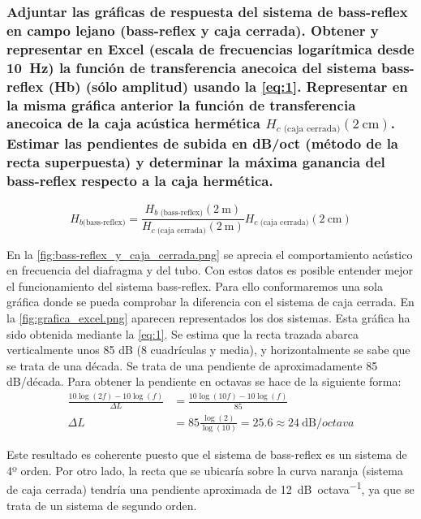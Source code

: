 \documentclass[10pt]{article}
\begin{document}
\subsubsection{Adjuntar las gráficas de respuesta del sistema de bass-reflex en campo lejano (bass-reflex y caja cerrada). Obtener y representar en Excel (escala de frecuencias logarítmica desde \qty{10}{\hertz }) la función de transferencia anecoica del sistema bass-reflex (Hb) (sólo amplitud) usando la \autoref{eq:1}. Representar en la misma gráfica anterior la función de transferencia anecoica de la caja acústica hermética $H_{c \text{ (caja cerrada)}} (\qty{2}{\centi\metre })$. Estimar las pendientes de subida en dB/oct (método de la recta superpuesta) y determinar la máxima ganancia del bass-reflex respecto a la caja hermética.}

\begin{equation} \label{eq:1}
  H_{b \text{(bass-reflex)}} = \frac{H_{b \text{ (bass-reflex)}}(\qty{2}{\metre })}{H_{c \text{ (caja cerrada)}} (\qty{2}{\metre })} H_{c \text{ (caja cerrada)}} (\qty{2}{\centi\metre })
\end{equation}

En la \autoref{fig:bass-reflex_y_caja_cerrada.png} se aprecia el comportamiento acústico en frecuencia del diafragma y del tubo. Con estos datos es posible entender mejor el funcionamiento del sistema bass-reflex. Para ello conformaremos una sola gráfica donde se pueda comprobar la diferencia con el sistema de caja cerrada. En la \autoref{fig:grafica_excel.png} aparecen representados los dos sistemas. Esta gráfica ha sido obtenida mediante la \autoref{eq:1}. Se estima que la recta trazada abarca verticalmente unos 85 dB (8 cuadrículas y media), y horizontalmente se sabe que se trata de una década. Se trata de una pendiente de aproximadamente 85 dB/década. Para obtener la pendiente en octavas se hace de la siguiente forma:
\begin{align*}
  \frac{10 \log \left( 2f \right) - 10 \log \left( f \right) }{\Delta L} & = \frac{10 \log \left( 10 f \right) - 10 \log \left( f \right) }{85}                              \\
  \Delta L                                                               & =85 \frac{\log \left( 2 \right) }{\log \left( 10 \right)} = 25.6 \approx \qty{24}{\dB\per octava}
\end{align*}

Este resultado es coherente puesto que el sistema de bass-reflex es un sistema de 4º orden. Por otro lado, la recta que se ubicaría sobre la curva naranja (sistema de caja cerrada) tendría una pendiente aproximada de \qty{12}{\dB\per octava}, ya que se trata de un sistema de segundo orden.
\end{document}
